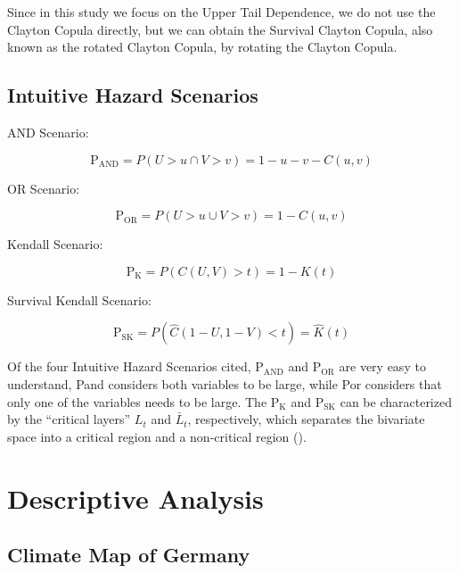 \documentclass[
]{krantz}
\begin{document}
Since in this study we focus on the Upper Tail Dependence, we do not use the Clayton Copula directly, but we can obtain the Survival Clayton Copula, also known as the rotated Clayton Copula, by rotating the Clayton Copula.

\subsection{Intuitive Hazard Scenarios}\label{hazardscenarios-shiyu}

AND Scenario:

\[ \text{P}_\text{AND} = P(U > u \cap V > v) = 1 - u - v - C(u, v) \tag{17}\]

OR Scenario:

\[ \text{P}_\text{OR} = P(U > u  \cup V > v) = 1 - C(u, v) \tag{18}\]

Kendall Scenario:

\[ \text{P}_\text{K} = P(C(U, V) > t) = 1 - K(t) \tag{19}\]

Survival Kendall Scenario:

\[ \text{P}_\text{SK} = P( \hat{C}(1 - U, 1 - V) < t) = \hat{K}(t) \tag{20}\]

Of the four Intuitive Hazard Scenarios cited, \(\text{P}_\text{AND}\) and \(\text{P}_\text{OR}\) are very easy to understand, Pand considers both variables to be large, while Por considers that only one of the variables needs to be large. The \(\text{P}_\text{K}\) and \(\text{P}_\text{SK}\) can be characterized by the ``critical layers'' \(L_t\) and \(\bar{L}_t\), respectively, which separates the bivariate space into a critical region and a non-critical region (\citet{zscheischler2020}).

\section{Descriptive Analysis}\label{descriptive-shiyu}

\subsection{Climate Map of Germany}\label{map-shiyu}
\end{document}
